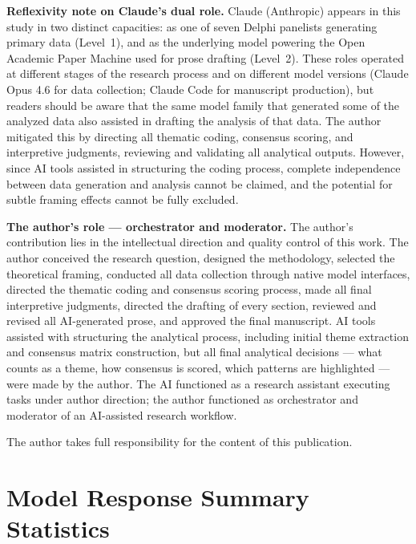 \documentclass[preprint,review,12pt]{elsarticle}
\begin{document}
\textbf{Reflexivity note on Claude's dual role.} Claude (Anthropic) appears in this study in two distinct capacities: as one of seven Delphi panelists generating primary data (Level~1), and as the underlying model powering the Open Academic Paper Machine used for prose drafting (Level~2). These roles operated at different stages of the research process and on different model versions (Claude Opus 4.6 for data collection; Claude Code for manuscript production), but readers should be aware that the same model family that generated some of the analyzed data also assisted in drafting the analysis of that data. The author mitigated this by directing all thematic coding, consensus scoring, and interpretive judgments, reviewing and validating all analytical outputs. However, since AI tools assisted in structuring the coding process, complete independence between data generation and analysis cannot be claimed, and the potential for subtle framing effects cannot be fully excluded.

\textbf{The author's role --- orchestrator and moderator.} The author's contribution lies in the intellectual direction and quality control of this work. The author conceived the research question, designed the methodology, selected the theoretical framing, conducted all data collection through native model interfaces, directed the thematic coding and consensus scoring process, made all final interpretive judgments, directed the drafting of every section, reviewed and revised all AI-generated prose, and approved the final manuscript. AI tools assisted with structuring the analytical process, including initial theme extraction and consensus matrix construction, but all final analytical decisions --- what counts as a theme, how consensus is scored, which patterns are highlighted --- were made by the author. The AI functioned as a research assistant executing tasks under author direction; the author functioned as orchestrator and moderator of an AI-assisted research workflow.

The author takes full responsibility for the content of this publication.


\iffalse

\appendix

\section{Model Response Summary Statistics}
\label{sec:appendix_a}
\end{document}
